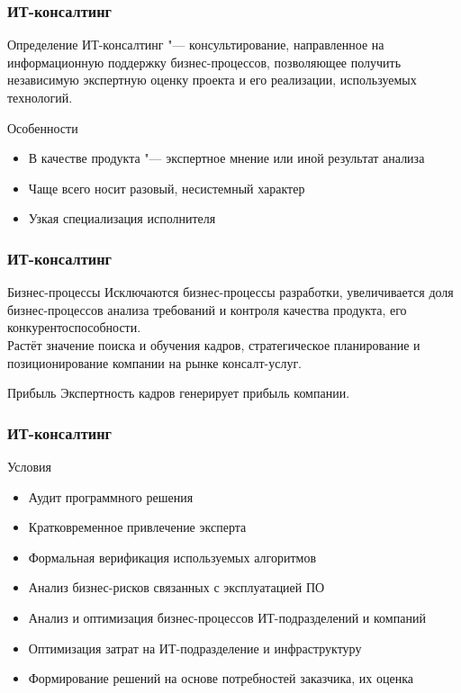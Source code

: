 \documentclass{../industrial-development}
\begin{document}
\begin{frame} \frametitle{ИТ-консалтинг}
	\begin{block}{Определение}
		\alert{ИТ-консалтинг} "--- консультирование, направленное на  информационную поддержку бизнес-процессов, позволяющее получить независимую экспертную оценку проекта и его реализации, используемых технологий.
	\end{block}
	\begin{block}{Особенности}
		\begin{itemize}
			\item В качестве продукта "--- экспертное мнение или иной результат анализа
			\item Чаще всего носит разовый, несистемный характер
			\item Узкая специализация исполнителя
		\end{itemize}
	\end{block}
\end{frame}
\lecturenotes


\begin{frame} \frametitle{ИТ-консалтинг}
	\begin{block}{Бизнес-процессы}
		Исключаются бизнес-процессы разработки, увеличивается доля бизнес-процессов анализа требований и контроля качества продукта, его конкурентоспособности.\\
		Растёт значение поиска и обучения кадров, стратегическое планирование и позиционирование компании на рынке консалт-услуг.
	\end{block}
	\begin{block}{Прибыль}
		Экспертность кадров генерирует прибыль компании.
	\end{block}
\end{frame}
\lecturenotes


\begin{frame} \frametitle{ИТ-консалтинг}
	\begin{block}{Условия}
		\begin{itemize}
			\item Аудит программного решения
			\item Кратковременное привлечение эксперта
			\item Формальная верификация используемых алгоритмов
			\item Анализ бизнес-рисков связанных с эксплуатацией ПО
			\item Анализ и оптимизация бизнес-процессов ИТ-подразделений и компаний
			\item Оптимизация затрат на ИТ-подразделение и инфраструктуру
			\item Формирование решений на основе потребностей заказчика, их оценка
		\end{itemize}
	\end{block}
\end{frame}
\lecturenotes
\end{document}

